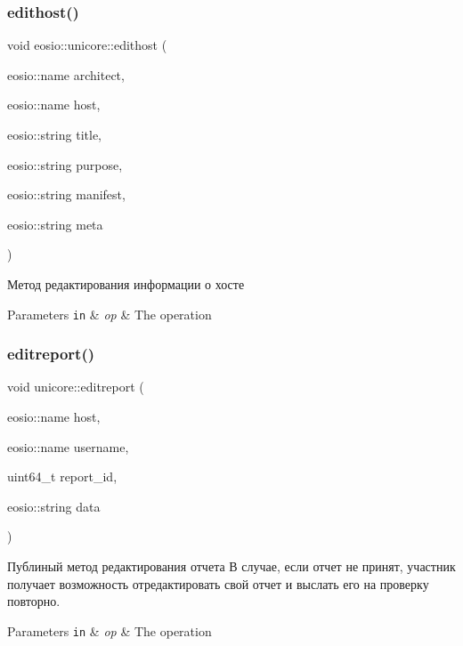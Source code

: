 \subsubsection{\texorpdfstring{edithost()}{edithost()}}
{\footnotesize\ttfamily void eosio\+::unicore\+::edithost (\begin{DoxyParamCaption}\item[{eosio\+::name}]{architect,  }\item[{eosio\+::name}]{host,  }\item[{eosio\+::string}]{title,  }\item[{eosio\+::string}]{purpose,  }\item[{eosio\+::string}]{manifest,  }\item[{eosio\+::string}]{meta }\end{DoxyParamCaption})}



Метод редактирования информации о хосте 


\begin{DoxyParams}[1]{Parameters}
\mbox{\tt in}  & {\em op} & The operation \\
\hline
\end{DoxyParams}
\mbox{\label{classeosio_1_1unicore_ad041a75ade13b77f67f54c99f7ca7d29}} 
\subsubsection{\texorpdfstring{editreport()}{editreport()}}
{\footnotesize\ttfamily void unicore\+::editreport (\begin{DoxyParamCaption}\item[{eosio\+::name}]{host,  }\item[{eosio\+::name}]{username,  }\item[{uint64\+\_\+t}]{report\+\_\+id,  }\item[{eosio\+::string}]{data }\end{DoxyParamCaption})}



Публиный метод редактирования отчета В случае, если отчет не принят, участник получает возможность отредактировать свой отчет и выслать его на проверку повторно. 


\begin{DoxyParams}[1]{Parameters}
\mbox{\tt in}  & {\em op} & The operation \\
\hline
\end{DoxyParams}
\mbox{\label{classeosio_1_1unicore_a81f044d8edee706d224c4569581df805}} 
